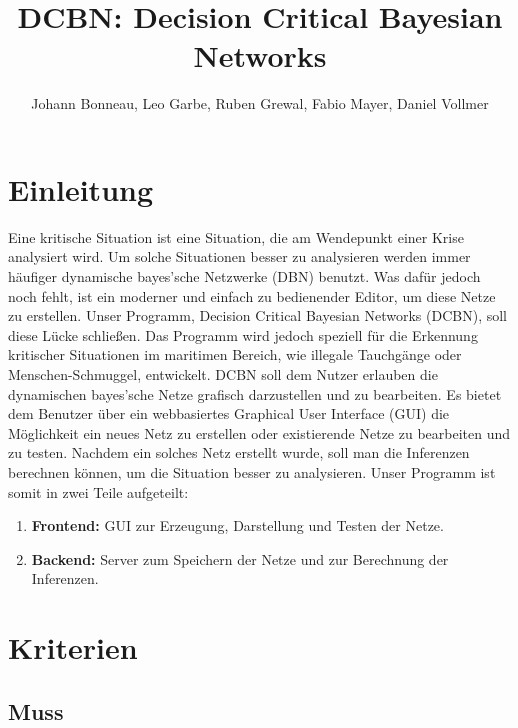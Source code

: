 \documentclass[parskip=full,11pt,twoside]{scrartcl}
\title{DCBN: Decision Critical Bayesian Networks}
\author{Johann Bonneau, Leo Garbe, Ruben Grewal, Fabio Mayer, Daniel Vollmer}
\begin{document}
\maketitle
\pagebreak
\tableofcontents


\section{Einleitung}

Eine kritische Situation ist eine Situation, die am Wendepunkt einer Krise analysiert wird. Um solche Situationen besser zu analysieren werden immer häufiger dynamische bayes'sche Netzwerke (DBN) benutzt. Was dafür jedoch noch fehlt, ist ein moderner und einfach zu bedienender Editor, um diese Netze zu erstellen. Unser Programm, Decision Critical Bayesian Networks (DCBN), soll diese Lücke schließen. Das Programm wird jedoch speziell für die Erkennung kritischer Situationen im maritimen Bereich, wie illegale Tauchgänge oder Menschen-Schmuggel, entwickelt. DCBN soll dem Nutzer erlauben die dynamischen bayes'sche Netze grafisch darzustellen und zu bearbeiten. Es bietet dem Benutzer über ein webbasiertes Graphical User Interface (GUI) die Möglichkeit ein neues Netz zu erstellen oder existierende Netze zu bearbeiten und zu testen. Nachdem ein solches Netz erstellt wurde, soll man die Inferenzen berechnen können, um die Situation besser zu analysieren. 
Unser Programm ist somit in zwei Teile aufgeteilt:
\begin{enumerate}
    \item \textbf{Frontend:} GUI zur Erzeugung, Darstellung und Testen der Netze.
    \item \textbf{Backend:} Server zum Speichern der Netze und zur Berechnung der Inferenzen. 
    
\end{enumerate}
\section{Kriterien}

\subsection{Muss}

\end{document}
